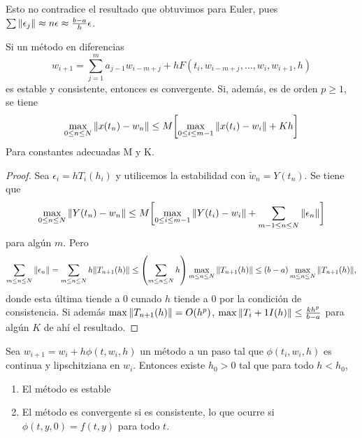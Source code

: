 \begin{remark}
    Esto no contradice el resultado que obtuvimos para Euler, pues
    $\sum\norm{\epsilon_j} \approx n\epsilon \approx \frac{b-a}{h}\epsilon$.
\end{remark}

\begin{theorem}
    Si un método en diferencias
    \begin{equation*}
        w_{i+1} = \sum_{j=1}^m {a_{j-1}w_{i-m+j}}
            + hF(t_i,w_{i-m+j}, \dots, w_i,w_{i+1},h)
    \end{equation*}
    es estable y consistente, entonces es convergente.
    Si, además, es de orden $p \geq 1$, se tiene
    \begin{equation*}
        \max_{0 \leq n \leq N}\norm{x(t_n) - w_n} \leq M\qty\bigg[
            \max_{0 \leq i \leq m-1} \norm{x(t_i) - w_i} + Kh
            ]
    \end{equation*}
    Para constantes adecuadas M y K.
\end{theorem}

\begin{proof}
    Sea $\epsilon_i = hT_i(h_i)$ y utilicemos la estabilidad
    con $\tilde{w}_n = Y(t_n)$. Se tiene que
    \begin{equation*}
        \max_{0 \leq n \leq N}\norm{Y(t_n) - w_n} \leq M\qty\bigg[
            \max_{0 \leq i \leq m-1}\norm{Y(t_i) - w_i}
            + \sum_{m-1\leq n \leq N}\norm{\epsilon_n}
        ]
    \end{equation*}
    para algún $m$. Pero
    \begin{equation*}
        \sum_{m \leq n \leq N} \norm{\epsilon_n} =
        \sum_{m \leq n \leq N} h\norm{T_{n+1}(h)} \leq
        \qty(\sum_{m \leq n \leq N} h)
            \max_{m \leq n \leq N}\norm{T_{n+1}(h)} \leq
        (b-a)\max_{m \leq n \leq N}\norm{T_{n+1}(h)},
    \end{equation*}
    donde esta última tiende a $0$ cunado $h$ tiende a $0$
    por la condición de consistencia.
    Si además $\max\norm{T_{n+1}(h)} = O(h^p)$,
    $\max\norm{T_i+1I(h)} \leq \frac{kh^p}{b-a}$ para algún $K$
    de ahí el resultado.
\end{proof}

\begin{theorem}
    Sea $w_{i+1} = w_i + h\phi(t, w_i, h)$ un método a un paso tal que
    $\phi(t_i, w_i, h)$ es continua y lipschitziana en $w_i$.
    Entonces existe $h_0 > 0$ tal que para todo $h < h_0$,
    \begin{enumerate}
        \item El método es estable
        \item El método es convergente si es consistente,
        lo que ocurre si $\phi(t, y, 0) = f(t, y)$ para todo $t$.
    \end{enumerate}
\end{theorem}

